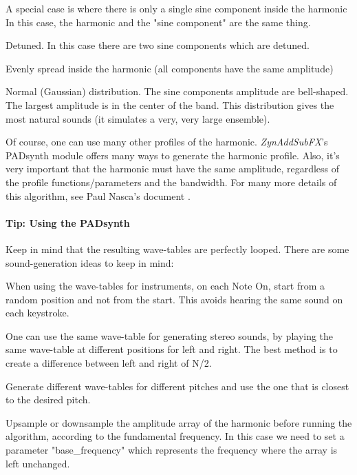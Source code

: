    \begin{enumber}
      \item  A special case is where there is only a single sine component
         inside the harmonic In this case, the harmonic and the "sine
         component" are the same thing.
      \item  Detuned. In this case there are two sine components which are
         detuned.
      \item  Evenly spread inside the harmonic (all components have the same
         amplitude)
      \item  Normal (Gaussian) distribution. The sine components amplitude are
         bell-shaped. The largest amplitude is in the center of the band. This
         distribution gives the most natural sounds (it simulates a very, very
         large ensemble).
   \end{enumber}

   Of course, one can use many other profiles of the harmonic.
   \textsl{ZynAddSubFX}'s PADsynth module offers many ways to generate the
   harmonic profile.  Also, it's very important that the harmonic must have the
   same amplitude, regardless of the profile functions/parameters and the
   bandwidth.
   For many more details of this algorithm, see Paul Nasca's document
   \cite{zyndoc}.

\paragraph{Tip: Using the PADsynth}
\label{tips_using_the_padsynth}

   Keep in mind that the resulting wave-tables are perfectly looped.
   There are some sound-generation ideas to keep in mind:

   \begin{enumber}
      \item When using the wave-tables for instruments, on each Note On, start
         from a random position and not from the start. This avoids hearing the
         same sound on each keystroke.
      \item One can use the same wave-table for generating stereo sounds, by
         playing the same wave-table at different positions for left and right.
         The best method is to create a difference between left and
         right of N/2.
      \item Generate different wave-tables for different pitches and use the
         one that is closest to the desired pitch.
      \item Upsample or downsample the amplitude array of the harmonic before
         running the algorithm, according to the fundamental frequency. In this
         case we need to set a parameter "base\_frequency" which represents the
         frequency where the array is left unchanged.
   \end{enumber}

